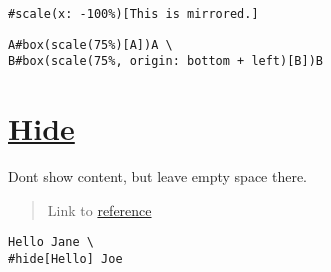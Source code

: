 \begin{verbatim}
#scale(x: -100%)[This is mirrored.]
\end{verbatim}

\pandocbounded{}

\begin{verbatim}
A#box(scale(75%)[A])A \
B#box(scale(75%, origin: bottom + left)[B])B
\end{verbatim}

\pandocbounded{}

\section{\texorpdfstring{\hyperref[hide]{Hide}}{Hide}}\label{hide}

Don\textquotesingle t show content, but leave empty space there.

\begin{quote}
Link to \href{https://typst.app/docs/reference/layout/hide/}{reference}
\end{quote}

\begin{verbatim}
Hello Jane \
#hide[Hello] Joe
\end{verbatim}

\pandocbounded{}
